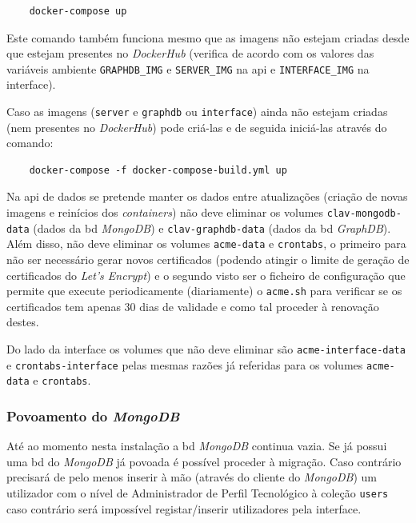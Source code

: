 \footnotesize
\begin{verbatim}
    docker-compose up
\end{verbatim}
\normalsize

Este comando também funciona mesmo que as imagens não estejam criadas desde que estejam presentes no \textit{DockerHub} (verifica de acordo com os valores das variáveis ambiente \texttt{GRAPHDB\_IMG} e \texttt{SERVER\_IMG} na \acrshort{api} e \texttt{INTERFACE\_IMG} na interface).

Caso as imagens (\texttt{server} e \texttt{graphdb} ou \texttt{interface}) ainda não estejam criadas (nem presentes no \textit{DockerHub}) pode criá-las e de seguida iniciá-las através do comando:

\footnotesize
\begin{verbatim}
    docker-compose -f docker-compose-build.yml up
\end{verbatim}
\normalsize

Na \acrshort{api} de dados se pretende manter os dados entre atualizações (criação de novas imagens e reinícios dos \textit{containers}) não deve eliminar os volumes \texttt{clav-mongodb-data} (dados da \acrshort{bd} \textit{MongoDB}) e \texttt{clav-graphdb-data} (dados da \acrshort{bd} \textit{GraphDB}). Além disso, não deve eliminar os volumes \texttt{acme-data} e \texttt{crontabs}, o primeiro para não ser necessário gerar novos certificados (podendo atingir o limite de geração de certificados do \textit{Let's Encrypt}) e o segundo visto ser o ficheiro de configuração que permite que execute periodicamente (diariamente) o \texttt{acme.sh} para verificar se os certificados tem apenas 30 dias de validade e como tal proceder à renovação destes.

Do lado da interface os volumes que não deve eliminar são \texttt{acme-interface-data} e \texttt{crontabs-interface} pelas mesmas razões já referidas para os volumes \texttt{acme-data} e \texttt{crontabs}. 

\subsubsection{Povoamento do \textit{MongoDB}}\label{sec:inst-povMDB}
Até ao momento nesta instalação a \acrshort{bd} \textit{MongoDB} continua vazia. Se já possui uma \acrshort{bd} do \textit{MongoDB} já povoada é possível proceder à migração. Caso contrário precisará de pelo menos inserir à mão (através do cliente do \textit{MongoDB}) um utilizador com o nível de Administrador de Perfil Tecnológico à coleção \texttt{users} caso contrário será impossível registar/inserir utilizadores pela interface.

